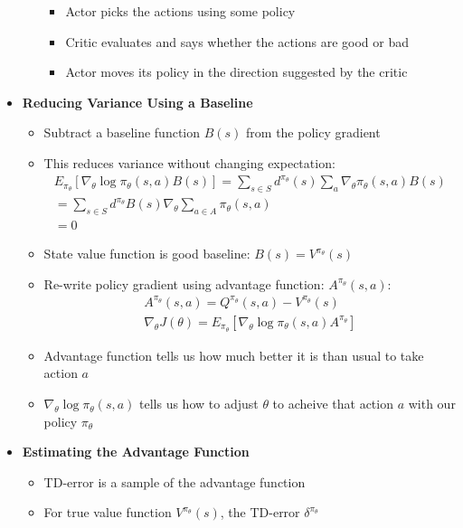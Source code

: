 \documentclass[12pt]{article}
\begin{document}
\begin{itemize}
\begin{itemize}
    \begin{itemize}
      \item Actor picks the actions using some policy
      \item Critic evaluates and says whether the actions are good or bad
      \item Actor moves its policy in the direction suggested by the critic
    \end{itemize}
  \end{itemize}
  \item \textbf{Reducing Variance Using a Baseline}
  \begin{itemize}
    \item Subtract a baseline function $B(s)$ from the policy gradient
    \item This reduces variance without changing expectation:
    \begin{gather*}
      E_{\pi_\theta}[\nabla_\theta \log \pi_\theta (s, a) B(s)] = \sum\limits_{s \in S}d^{\pi_\theta}(s) \sum\limits_{a} \nabla_\theta \pi_\theta (s,a) B(s) \\
      = \sum\limits_{s \in S} d^{\pi_\theta} B(s) \nabla_\theta \sum\limits_{a \in A} \pi_\theta (s,a) \\
      = 0
    \end{gather*}
    \item State value function is good baseline: $B(s) = V^{\pi_\theta}(s)$
    \item Re-write policy gradient using advantage function: $A^{\pi_\theta}(s,a)$:
    \begin{gather*}
      A^{\pi_\theta}(s, a) = Q^{\pi_\theta}(s, a) - V^{\pi_\theta}(s) \\
      \nabla_\theta J(\theta) = E_{\pi_\theta}[\nabla_\theta \log \pi_\theta(s,a) A^{\pi_\theta}]
    \end{gather*}
    \item Advantage function tells us how much better it is than usual to take action $a$
    \item $\nabla_\theta \log \pi_\theta (s,a)$ tells us how to adjust $\theta$ to acheive that action $a$ with our policy $\pi_\theta$
  \end{itemize}
  \item \textbf{Estimating the Advantage Function}
  \begin{itemize}
    \item TD-error is a sample of the advantage function
    \item For true value function $V^{\pi_\theta}(s)$, the TD-error $\delta^{\pi_\theta}$

\end{itemize}
\end{itemize}
\end{document}
